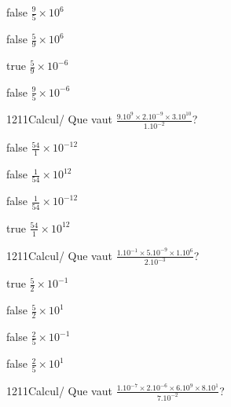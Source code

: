 \documentclass[11pt]{article}
\begin{document}
            \begin{reponses}
                \item[false] $\frac{9}{5}\times 10^{6}$
                \item[false] $\frac{5}{9}\times 10^{6}$
                \item[true] $\frac{5}{9}\times 10^{-6}$
                \item[false] $\frac{9}{5}\times 10^{-6}$
            \end{reponses}
            
            \begin{question}{1211}{Calcul}{}{/}
                Que vaut $\frac{9.10^{9}\times 2.10^{-9}\times 3.10^{10}}{1.10^{-2}}$?
            \end{question}
            
            \begin{reponses}
                \item[false] $\frac{54}{1}\times 10^{-12}$
                \item[false] $\frac{1}{54}\times 10^{12}$
                \item[false] $\frac{1}{54}\times 10^{-12}$
                \item[true] $\frac{54}{1}\times 10^{12}$
            \end{reponses}
            
            \begin{question}{1211}{Calcul}{}{/}
                Que vaut $\frac{1.10^{-1}\times 5.10^{-9}\times 1.10^{6}}{2.10^{-3}}$?
            \end{question}
            
            \begin{reponses}
                \item[true] $\frac{5}{2}\times 10^{-1}$
                \item[false] $\frac{5}{2}\times 10^{1}$
                \item[false] $\frac{2}{5}\times 10^{-1}$
                \item[false] $\frac{2}{5}\times 10^{1}$
            \end{reponses}
            
            \begin{question}{1211}{Calcul}{}{/}
                Que vaut $\frac{1.10^{-7}\times 2.10^{-6}\times 6.10^{9}\times 8.10^{1}}{7.10^{-2}}$?
            \end{question}
            
\end{document}
